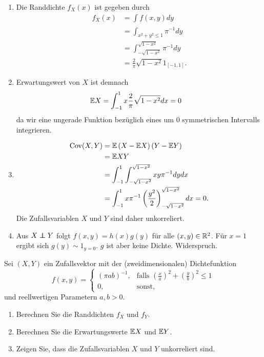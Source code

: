 \solution 
\begin{enumerate}
    \item Die Randdichte $f_{X}(x)$ ist gegeben durch
        \begin{align*}
            f_{X}(x) &= \int_{}^{} f(x,y) dy \\
            &= \int_{x^2+y^2 \leq 1}^{} \pi^{-1} dy \\
            &= \int_{- \sqrt{1-x^2}}^{\sqrt{1-x^2}} \pi^{-1} dy \\
            &= \frac{2}{\pi} \sqrt{1-x^2} 1_{[-1,1]}.
        \end{align*}
    \item Erwartungswert von $X$ ist demnach
        \begin{align*}
            \mathbb{E} X &= \int_{-1}^{1} x \frac{2}{\pi} \sqrt{1-x^2} dx = 0
        \end{align*}
        da wir eine ungerade Funktion bezüglich eines um $0$ symmetrischen 
        Intervalls integrieren.
    \item 
        \begin{align*}
            \operatorname{Cov}(X,Y) &= \mathbb{E} \left( X-\mathbb{E} X \right)\left( Y- \mathbb{E} Y \right) \\
            &= \mathbb{E} XY \\
            &= \int_{-1}^{1} \int_{-\sqrt{1-x^2}}^{\sqrt{1-x^2}} xy \pi^{-1} dy dx \\
            &= \int_{-1}^{1} x \pi^{-1} \left( \frac{y^2}{2} \right)^{\sqrt{1-x^{2}}}_{-\sqrt{1-x^{2}}} dx = 0.
        \end{align*}
        Die Zufallsvariablen $X$ und $Y$ sind daher unkorreliert.
    \item 
        Aus $X \upmodels Y$ folgt $f(x,y) = h(x) g(y)$ für alle $(x,y) \in
        \mathbb R^{2}$. Für $x=1$ ergibt sich $g(y) \sim 1_{y=0}$. $g$ ist aber keine
        Dichte. Widerspruch.
\end{enumerate}

 Sei $(X,Y)$
ein Zufallsvektor mit der (zweidimensionalen) Dichtefunktion 
\begin{equation*}
    f(x,y) = \begin{cases}
        \left( \pi a b \right)^{-1}, & \text{falls } \left( \frac{x}{a} \right)^{2} + \left( \frac{y}{b} \right)^{2} \leq 1 \\
        0,& \text{sonst,}
    \end{cases}
\end{equation*}
und reellwertigen Parametern $a,b > 0$. 
\begin{enumerate}
    \item Berechnen Sie die Randdichten $f_{X}$ und $f_{Y}$.
    \item Berechnen Sie die Erwartungswerte $\mathbb{E} X$ und $\mathbb{E} Y$.
    \item Zeigen Sie, dass die Zufallsvariablen $X$ und $Y$ unkorreliert sind.
\end{enumerate}

